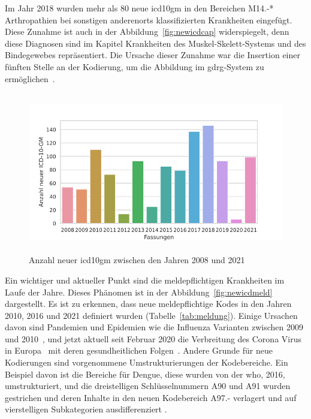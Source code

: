 Im Jahr 2018 wurden mehr als 80 neue \ac{icd10gm} in den Bereichen \textsf{M14.-*} \textsf{Arthropathien bei sonstigen anderenorts klassifizierten Krankheiten} eingefügt. Diese Zunahme ist auch in der Abbildung~\ref{fig:newicdcap} widerspiegelt, denn diese Diagnosen sind im Kapitel \textsf{Krankheiten des Muskel-Skelett-Systems und des Bindegewebes} repräsentiert. Die Ursache dieser Zunahme war die Insertion einer fünften Stelle an der Kodierung, um die Abbildung im \ac{gdrg}-System zu ermöglichen~\cite{musk18}.


\begin{figure}[ht]
	\centering
	\includegraphics[height=7cm]{figures/newicdyear}
	\caption[Neue \acs{icd10gm} pro Jahr]{Anzahl neuer \acs{icd10gm} zwischen den Jahren 2008 und 2021}
	\label{fig:newicdyear}
\end{figure} 

Ein wichtiger und aktueller Punkt sind die meldepflichtigen Krankheiten im Laufe der Jahre. Dieses Phänomen ist in der Abbildung~\ref{fig:newicdmeld} dargestellt. Es ist zu erkennen, dass neue meldepflichtige Kodes in den Jahren 2010, 2016 und 2021 definiert wurden (Tabelle~\ref{tab:meldung}). Einige Ursachen davon sind Pandemien und Epidemien wie die Influenza Varianten zwischen 2009 und 2010~\cite{influenza1, influenza2}, und jetzt aktuell seit Februar 2020 die Verbreitung des Corona Virus in Europa~\cite{corona1} mit deren gesundheitlichen Folgen~\cite{corona2}. Andere Grunde für neue Kodierungen sind vorgenommene Umstrukturierungen der Kodebereiche. Ein Beispiel davon ist die Bereiche für Dengue, diese wurden von der \ac{who}, 2016, umstrukturiert, und die dreistelligen Schlüsselnummern \textsf{A90} und \textsf{A91} wurden gestrichen und deren Inhalte in den neuen Kodebereich \textsf{A97.-} verlagert und auf vierstelligen Subkategorien ausdifferenziert \cite{komm16}.

